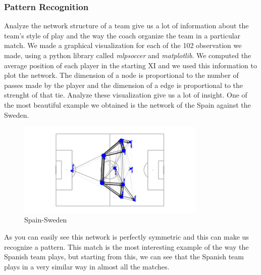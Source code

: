 \documentclass[12pt, a4paper]{article}
\begin{document}
\subsubsection{Pattern Recognition}
Analyze the network structure of a team give us a lot of information about the team's style of play and the way the coach organize the team in a particular match. We made a graphical visualization for each of the 102 observation we made, using a python library called \emph{mlpsoccer} and \emph{matplotlib}. We computed the average position of each player in the starting XI and we used this information to plot the network. The dimension of a node is proportional to the number of passes made by the player and the dimension of a edge is proportional to the strenght of that tie. Analyze these visualization give us a lot of insight. One of the most beautiful example we obtained is the network of the Spain against the Sweden. \\
\begin{figure}
        \centering
        \includegraphics[width=0.8\textwidth]{../NoSubs/imgWithoutSubs/Spain_Network_Spain_Sweden.png}
        \caption{Spain-Sweden}
\end{figure}
As you can easily see this network is perfectly symmetric and this can make us recognize a pattern. This match is the most interesting example of the way the Spanish team plays, but starting from this, we can see that the Spanish team plays in a very similar way in almost all the matches. \\
\begin{figure}%
        \centering
        \qquad
        \label{fig:example}%
    \end{figure}
\end{document}

